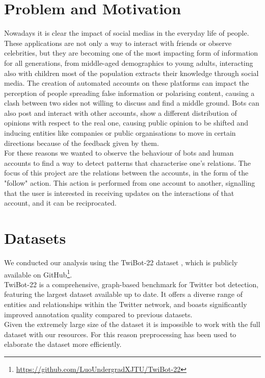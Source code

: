 \documentclass[12pt, a4paper]{article}
\begin{document}
\section{Problem and Motivation}
	\label{problem-and-motivation}
    Nowadays it is clear the impact of social medias in the everyday life of people. These applications are not only a way to interact with friends or observe celebrities, but they are becoming one of the most impacting form of information for all generations, from middle-aged demographics to young adults, interacting also with children most of the population extracts their knowledge through social media. The creation of automated accounts on these platforms can impact the perception of people spreading false information or polarising content, causing a clash between two sides not willing to discuss and find a middle ground. Bots can also post and interact with other accounts, show a different distribution of opinions with respect to the real one, causing public opinion to be shifted and inducing entities like companies or public organisations to move in certain directions because of the feedback given by them.\\
    For these reasons we wanted to observe the behaviour of bots and human accounts to find a way to detect patterns that characterise one's relations. The focus of this project are the relations between the accounts, in the form of the "follow" action. This action is performed from one account to another, signalling that the user is interested in receiving updates on the interactions of that account, and it can be reciprocated.


\section{Datasets}
	\label{datasets}
	We conducted our analysis using the TwiBot-22 dataset \cite{twibot22}, which is publicly available on GitHub\footnote{\href{https://github.com/LuoUndergradXJTU/TwiBot-22}{https://github.com/LuoUndergradXJTU/TwiBot-22}}.\\
	TwiBot-22 is a comprehensive, graph-based benchmark for Twitter bot detection, featuring the largest dataset available up to date. It offers a diverse range of entities and relationships within the Twitter network, and boasts significantly improved annotation quality compared to previous datasets.\\
	Given the extremely large size of the dataset it is impossible to work with the full dataset with our resources. For this reason preprocessing has been used to elaborate the dataset more efficiently.
\end{document}
